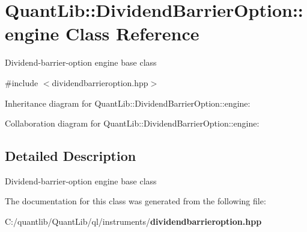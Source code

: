 \section{Quant\+Lib\+:\+:Dividend\+Barrier\+Option\+:\+:engine Class Reference}
\label{class_quant_lib_1_1_dividend_barrier_option_1_1engine}


Dividend-\/barrier-\/option engine base class  




{\ttfamily \#include $<$dividendbarrieroption.\+hpp$>$}



Inheritance diagram for Quant\+Lib\+:\+:Dividend\+Barrier\+Option\+:\+:engine\+:


Collaboration diagram for Quant\+Lib\+:\+:Dividend\+Barrier\+Option\+:\+:engine\+:


\subsection{Detailed Description}
Dividend-\/barrier-\/option engine base class 

The documentation for this class was generated from the following file\+:\begin{DoxyCompactItemize}
\item 
C\+:/quantlib/\+Quant\+Lib/ql/instruments/{\bf dividendbarrieroption.\+hpp}\end{DoxyCompactItemize}
